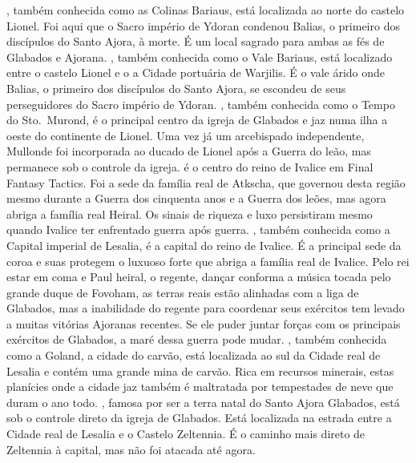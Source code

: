 \vfill
%
, também conhecida como as Colinas Bariaus, está localizada ao norte do castelo Lionel. Foi aqui que o Sacro império de Ydoran condenou Balias, o primeiro dos discípulos do Santo Ajora, à morte.
É um local sagrado para ambas as fés de Glabados e Ajorana.
, também conhecida como o Vale Bariaus, está localizado  entre o castelo Lionel e o a Cidade portuária de Warjilis. É o vale árido onde Balias, o primeiro dos discípulos do Santo Ajora, se escondeu de seus perseguidores do Sacro império de Ydoran.
, também conhecida como o Tempo do Sto.~Murond, é o principal centro da igreja de Glabados e jaz numa ilha a oeste do continente de Lionel.
Uma vez já um arcebispado independente, Mullonde foi incorporada ao ducado de Lionel após a Guerra do leão, mas permanece sob o controle da igreja.
%
%
\clearpage
%
 é o centro do reino de Ivalice em Final Fantasy Tactics. Foi a sede da família real de Atkscha, que governou desta região mesmo durante a Guerra dos cinquenta anos e a Guerra dos leões, mas agora abriga a família real Heiral.
Os sinais de riqueza e luxo persistiram mesmo quando Ivalice ter enfrentado guerra após guerra.
, também conhecida como a Capital imperial de Lesalia, é a capital do reino de Ivalice.
É a principal sede da coroa e suas protegem o luxuoso forte que abriga a família real de Ivalice.
Pelo rei estar em coma e Paul heiral, o regente, dançar conforma a música tocada pelo grande duque de Fovoham, as terras reais estão alinhadas com a liga de Glabados, mas a inabilidade do regente para coordenar seus exércitos tem levado a muitas vitórias Ajoranas recentes.
Se ele puder juntar forças com os principais exércitos de Glabados, a maré dessa guerra pode mudar.
, também conhecida como a Goland, a cidade do carvão, está localizada ao sul da Cidade real de Lesalia e contém uma grande mina de carvão.
Rica em recursos minerais, estas planícies onde a cidade jaz também é maltratada por tempestades de neve que duram o ano todo.
, famosa por ser a terra natal do Santo Ajora Glabados, está sob o controle direto da igreja de Glabados.
Está localizada na estrada entre a Cidade real de Lesalia e o Castelo Zeltennia.
É o caminho mais direto de Zeltennia à capital, mas não foi atacada até agora.
%
\ofpar
